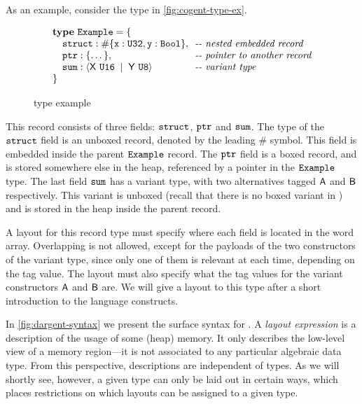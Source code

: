 As an example, consider the \cogent type in \autoref{fig:cogent-type-ex}.
\begin{figure}
  \centering
  $$
  \begin{array}{ll}
    \mathbf{type}\ \texttt{Example} = \{ \\
  \quad \texttt{struct} : \#\{\texttt{x} : \texttt{U32}, \texttt{y} : \texttt{Bool}\},
    & \!\!\textit{-{}- nested embedded record} \\
  \quad \texttt{ptr} : \{\dots\},
    & \!\!\textit{-{}- pointer to another record} \\
  \quad \texttt{sum} : \langle \mathsf{X}\ \texttt{U16} \;\mid\; \mathsf{Y}\ \texttt{U8} \rangle
    & \!\!\textit{-{}- variant type} \\
    \} 
  \end{array}
  $$
  \caption{\Cogent type example}
  \label{fig:cogent-type-ex}
\end{figure}
This record consists of three fields: $\texttt{struct}$, $\texttt{ptr}$ and $\texttt{sum}$.
The type of the $\texttt{struct}$ field is an unboxed record, denoted by the leading $\#$ symbol. This field is
embedded inside the parent $\texttt{Example}$ record. The $\texttt{ptr}$ field is a boxed
record, and is stored somewhere else in the heap, referenced by a pointer in the $\texttt{Example}$
type. The last field $\texttt{sum}$ has a variant type, with two alternatives tagged $\mathsf{A}$ and $\mathsf{B}$
respectively. This variant is unboxed (recall that there is no boxed variant in \cogent) and
is stored in the heap inside the parent record.

A layout for this record type must specify where each field is located in the
word array. Overlapping is not allowed, except for the payloads of the two constructors
of the variant type, since only one of them is
relevant at each time, depending on the tag value. The layout must also specify 
what the tag values for the variant constructors $\mathsf{A}$ and $\mathsf{B}$ are.
We will give a layout to this type after a short
introduction to the \dargent language constructs.

%



In \autoref{fig:dargent-syntax} we present the surface syntax for \Dargent.
A \emph{layout expression} is a description of the usage of some (heap) memory.
It only describes the low-level view of a memory region---it is not associated
to any particular algebraic data type. From this perspective, \dargent descriptions
are independent of \cogent types. As we will shortly see, however, a given \cogent type can only be laid out in certain ways, which places restrictions on which layouts can be assigned to a given type. 

